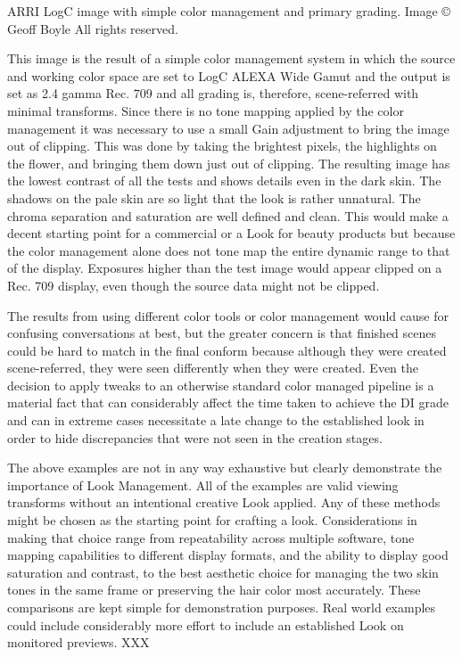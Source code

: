 ARRI LogC image with simple color management and primary grading.  Image © Geoff Boyle All rights reserved.

This image is the result of a simple color management system in which the source and working color space are set to LogC ALEXA Wide Gamut and the output is set as 2.4 gamma Rec. 709 and all grading is, therefore, scene-referred with minimal transforms. Since there is no tone mapping applied by the color management it was necessary to use a small Gain adjustment to bring the image out of clipping. This was done by taking the brightest pixels, the highlights on the flower, and bringing them down just out of clipping. The resulting image has the lowest contrast of all the tests and shows details even in the dark skin. The shadows on the pale skin are so light that the look is rather unnatural. The chroma separation and saturation are well defined and clean. This would make a decent starting point for a commercial or a Look for beauty products but because the color management alone does not tone map the entire dynamic range to that of the display. Exposures higher than the test image would appear clipped on a Rec. 709 display, even though the source data might not be clipped.

The results from using different color tools or color management would cause for confusing conversations at best, but the greater concern is that finished scenes could be hard to match in the final conform because although they were created scene-referred, they were seen differently when they were created. Even the decision to apply tweaks to an otherwise standard color managed pipeline is a material fact that can considerably affect the time taken to achieve the DI grade and can in extreme cases necessitate a late change to the established look in order to hide discrepancies that were not seen in the creation stages. 

The above examples are not in any way exhaustive but clearly demonstrate the importance of Look Management. All of the examples are valid viewing transforms without an intentional creative Look applied. Any of these methods might be chosen as the starting point for crafting a look. Considerations in making that choice range from repeatability across multiple software, tone mapping capabilities to different display formats, and the ability to display good saturation and contrast, to the best aesthetic choice for managing the two skin tones in the same frame or preserving the hair color most accurately. These comparisons are kept simple for demonstration purposes. Real world examples could include considerably more effort to include an established Look on monitored previews.
XXX

